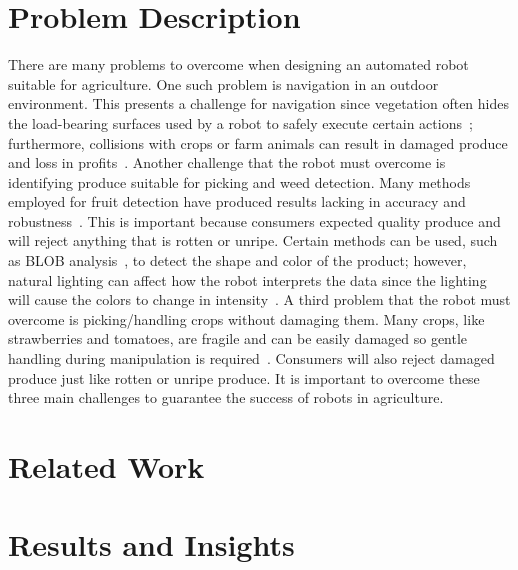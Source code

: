 \documentclass[12pt]{article}
\begin{document}
\section{Problem Description}
There are many problems to overcome when designing an automated robot suitable for agriculture. One such problem is navigation in an outdoor environment. This presents a challenge for navigation since vegetation often hides the load-bearing surfaces used by a robot to safely execute certain actions~\cite{1307135}; furthermore, collisions with crops or farm animals can result in damaged produce and loss in profits~\cite{madokoro2021prototype}. Another challenge that the robot must overcome is identifying produce suitable for picking and weed detection. Many methods employed for fruit detection have produced results lacking in accuracy and robustness~\cite{chen2021detecting}. This is important because consumers expected quality produce and will reject anything that is rotten or unripe. Certain methods can be used, such as BLOB analysis~\cite{dewi2021blob}, to detect the shape and color of the product; however, natural lighting can affect how the robot interprets the data since the lighting will cause the colors to change in intensity~\cite{wang2022review}. A third problem that the robot must overcome is picking/handling crops without damaging them. Many crops, like strawberries and tomatoes, are fragile and can be easily damaged so gentle handling during manipulation is required~\cite{xiong2020autonomous}. Consumers will also reject damaged produce just like rotten or unripe produce. It is important to overcome these three main challenges to guarantee the success of robots in agriculture.

\section{Related Work}

\section{Results and Insights}
\end{document}
